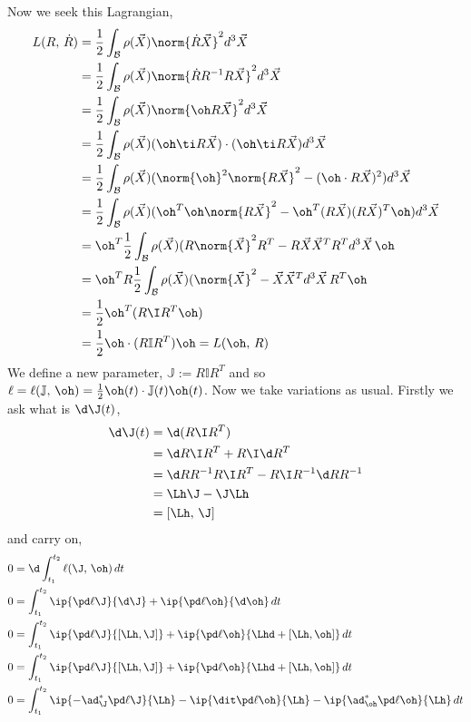 \noindent
Now we seek this Lagrangian,
\begin{align*}
  L(R,\,\dot R) &= \frac{1}{2}\int_{\mathcal{B}}\rho(\vec X)\norm{\dot R \vec X}^2d^3\vec X\\
  &= \frac{1}{2}\int_{\mathcal{B}}\rho(\vec X)\norm{\dot RR^{-1}R \vec X}^2d^3\vec X\\
  &= \frac{1}{2}\int_{\mathcal{B}}\rho(\vec X)\norm{\oh R \vec X}^2d^3\vec X\\
  &= \frac{1}{2}\int_{\mathcal{B}}\rho(\vec X)(\oh \ti R\vec X) \cdot (\oh \ti R\vec X)d^3\vec X\\
  &= \frac{1}{2}\int_\mathcal{B}\rho(\vec X) (\norm{\oh}^2\norm{R\vec X}^2 - (\oh \cdot R\vec X)^2)d^3\vec X\\
  &= \frac{1}{2}\int_\mathcal{B}\rho(\vec X) (\oh^T \oh\norm{R\vec X}^2 - \oh^T (R\vec X)(R\vec X)^T\oh )d^3\vec X\\
  &= \oh^T\frac{1}{2}\int_\mathcal{B}\rho(\vec X) (R\norm{\vec X}^2 R^T - R\vec X\vec X^T R^T d^3\vec X \,\oh\\
  &= \oh^TR\frac{1}{2}\int_\mathcal{B}\rho(\vec X) (\norm{\vec X}^2 - \vec X\vec X^T d^3\vec X \,R^T\oh\\
  &= \frac{1}{2}\oh^T (R\I R^T \oh) \\
  &= \frac{1}{2}\oh \cdot (R\mathbb{I} R^T)\oh = L(\oh,\,R)
\end{align*}
We define a new parameter, $\mathbb{J} := R\mathbb{I}R^T$ and so $\ell = \ell(\mathbb{J},\,\oh) = \frac{1}{2}\oh(t) \cdot \mathbb{J}(t) \oh(t)$. %
Now we take variations as usual. Firstly we ask what is $\d\J(t)$,
\begin{align*}
  \d\J(t) &= \d(R\I R^T)\\
  &= \d R\I R^T + R\I \d R^T\\
  &= \d R R^{-1}R\I R^T - R\I R^{-1}\d R R^{-1}\\
  &= \Lh \J - \J \Lh\\
  &= [\Lh,\,\J]
\end{align*}
and carry on,
\begin{align*}
  0 &= \d\int_{t_1}^{t_2} \ell(\J,\,\oh)\,dt \\
  0 &= \int_{t_1}^{t_2}  \ip{\pd \ell \J}{\d \J} + \ip{\pd \ell {\oh}}{\d \oh}\,dt\\
  0 &= \int_{t_1}^{t_2}  \ip{\pd \ell \J}{[\Lh, \J]} + \ip{\pd \ell {\oh}}{\Lhd + [\Lh, \oh]}\,dt\\
  0 &= \int_{t_1}^{t_2}  \ip{\pd \ell \J}{[\Lh, \J]} + \ip{\pd \ell {\oh}}{\Lhd + [\Lh, \oh]}\,dt\\
  0 &= \int_{t_1}^{t_2} \ip{-\ad_\J^* \pd \ell \J}{\Lh} - \ip{\dit \pd \ell {\oh}}{\Lh} - \ip{\ad_{\oh}^* \pd \ell \oh}{\Lh}\,dt
\end{align*}
